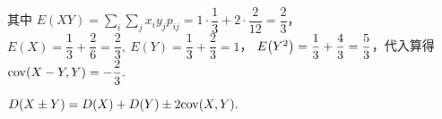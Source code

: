 \begin{solution}
\begin{minipage}{0.69\linewidth}
\begin{enumerate}[label=(\arabic{*})]
                  其中 $\displaystyle E(XY)=\sum_i\sum_j x_iy_jp_{ij}=1\cdot\dfrac{1}{3}+2\cdot\dfrac{2}{12}=\dfrac{2}{3}$，
                  $E(X)=\dfrac{1}{3}+\dfrac{2}{6}=\dfrac{2}{3},~E(Y)=\dfrac{1}{3}+\dfrac{2}{3}=1$，
                  $E\qty(Y^2)=\dfrac{1}{3}+\dfrac{4}{3}=\dfrac{5}{3}$，代入算得 $\mathrm{cov}(X-Y,Y)=-\dfrac{2}{3}.$
        \end{enumerate}
    \end{minipage}
\end{solution}

\begin{theorem}[协方差与方差]
    $D(X\pm Y)=D(X)+D(Y)\pm 2\mathrm{cov}(X,Y).$
\end{theorem}

